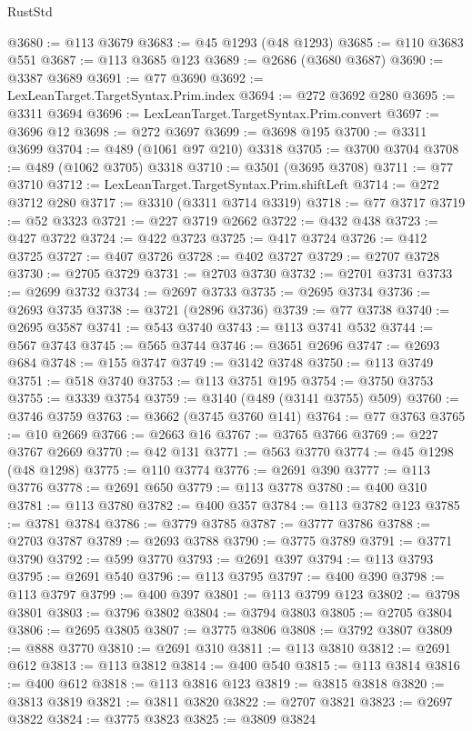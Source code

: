 \begin{lexlean}{RustStd}
\begin{coremodule}
@3680 := @113 @3679
@3683 := @45 @1293 (@48 @1293)
@3685 := @110 @3683 @551
@3687 := @113 @3685 @123
@3689 := @2686 (@3680 @3687)
@3690 := @3387 @3689
@3691 := @77 @3690
@3692 := LexLeanTarget.TargetSyntax.Prim.index
@3694 := @272 @3692 @280
@3695 := @3311 @3694
@3696 := LexLeanTarget.TargetSyntax.Prim.convert
@3697 := @3696 @12
@3698 := @272 @3697
@3699 := @3698 @195
@3700 := @3311 @3699
@3704 := @489 (@1061 @97 @210) @3318
@3705 := @3700 @3704
@3708 := @489 (@1062 @3705) @3318
@3710 := @3501 (@3695 @3708)
@3711 := @77 @3710
@3712 := LexLeanTarget.TargetSyntax.Prim.shiftLeft
@3714 := @272 @3712 @280
@3717 := @3310 (@3311 @3714 @3319)
@3718 := @77 @3717
@3719 := @52 @3323
@3721 := @227 @3719 @2662
@3722 := @432 @438
@3723 := @427 @3722
@3724 := @422 @3723
@3725 := @417 @3724
@3726 := @412 @3725
@3727 := @407 @3726
@3728 := @402 @3727
@3729 := @2707 @3728
@3730 := @2705 @3729
@3731 := @2703 @3730
@3732 := @2701 @3731
@3733 := @2699 @3732
@3734 := @2697 @3733
@3735 := @2695 @3734
@3736 := @2693 @3735
@3738 := @3721 (@2896 @3736)
@3739 := @77 @3738
@3740 := @2695 @3587
@3741 := @543 @3740
@3743 := @113 @3741 @532
@3744 := @567 @3743
@3745 := @565 @3744
@3746 := @3651 @2696
@3747 := @2693 @684
@3748 := @155 @3747
@3749 := @3142 @3748
@3750 := @113 @3749
@3751 := @518 @3740
@3753 := @113 @3751 @195
@3754 := @3750 @3753
@3755 := @3339 @3754
@3759 := @3140 (@489 (@3141 @3755) @509)
@3760 := @3746 @3759
@3763 := @3662 (@3745 @3760 @141)
@3764 := @77 @3763
@3765 := @10 @2669
@3766 := @2663 @16
@3767 := @3765 @3766
@3769 := @227 @3767 @2669
@3770 := @42 @131
@3771 := @563 @3770
@3774 := @45 @1298 (@48 @1298)
@3775 := @110 @3774
@3776 := @2691 @390
@3777 := @113 @3776
@3778 := @2691 @650
@3779 := @113 @3778
@3780 := @400 @310
@3781 := @113 @3780
@3782 := @400 @357
@3784 := @113 @3782 @123
@3785 := @3781 @3784
@3786 := @3779 @3785
@3787 := @3777 @3786
@3788 := @2703 @3787
@3789 := @2693 @3788
@3790 := @3775 @3789
@3791 := @3771 @3790
@3792 := @599 @3770
@3793 := @2691 @397
@3794 := @113 @3793
@3795 := @2691 @540
@3796 := @113 @3795
@3797 := @400 @390
@3798 := @113 @3797
@3799 := @400 @397
@3801 := @113 @3799 @123
@3802 := @3798 @3801
@3803 := @3796 @3802
@3804 := @3794 @3803
@3805 := @2705 @3804
@3806 := @2695 @3805
@3807 := @3775 @3806
@3808 := @3792 @3807
@3809 := @888 @3770
@3810 := @2691 @310
@3811 := @113 @3810
@3812 := @2691 @612
@3813 := @113 @3812
@3814 := @400 @540
@3815 := @113 @3814
@3816 := @400 @612
@3818 := @113 @3816 @123
@3819 := @3815 @3818
@3820 := @3813 @3819
@3821 := @3811 @3820
@3822 := @2707 @3821
@3823 := @2697 @3822
@3824 := @3775 @3823
@3825 := @3809 @3824

\end{coremodule}
\end{lexlean}
